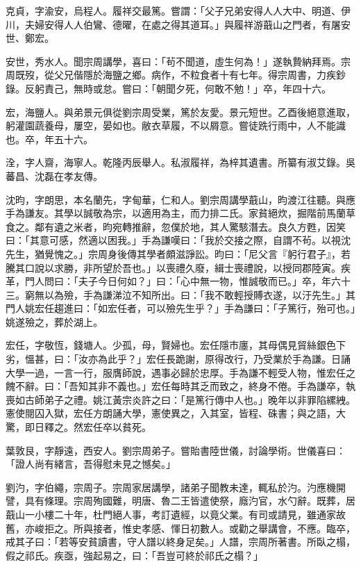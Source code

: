 \begin{pinyinscope}
克貞，字渝安，烏程人。履祥交最篤。嘗謂：「父子兄弟安得人人大中、明道、伊川，夫婦安得人人伯鸞、德曜，在處之得其道耳。」與履祥游蕺山之門者，有屠安世、鄭宏。

安世，秀水人。聞宗周講學，喜曰：「茍不聞道，虛生何為！」遂執贄納拜焉。宗周既歿，從父兄偕隱於海鹽之鄉。病作，不粒食者十有七年。得宗周書，力疾鈔錄。反躬責己，無時或怠。嘗曰：「朝聞夕死，何敢不勉！」卒，年四十六。

宏，海鹽人。與弟景元俱從劉宗周受業，篤於友愛。景元短世。乙酉後絕意進取，躬灌園蔬養母，屢空，晏如也。敝衣草履，不以屑意。嘗徒跣行雨中，人不能識也。卒，年五十六。

洤，字人齋，海寧人。乾隆丙辰舉人。私淑履祥，為梓其遺書。所纂有淑艾錄。吳蕃昌、沈磊在孝友傳。

沈昀，字朗思，本名蘭先，字甸華，仁和人。劉宗周講學蕺山，昀渡江往聽。與應手為謙友。其學以誠敬為宗，以適用為主，而力排二氏。家貧絕炊，掘階前馬蘭草食之。鄰有遺之米者，昀宛轉推辭，忽僕於地，其人驚駭潛去。良久方甦，因笑曰：「其意可感，然適以困我。」手為謙嘆曰：「我於交接之際，自謂不茍。以視沈先生，猶覺愧之。」宗周身後傳其學者頗滋諍訟。昀曰：「尼父言『躬行君子』，若騰其口說以求勝，非所望於吾也。」以喪禮久廢，緝士喪禮說，以授同郡陸寅。疾革，門人問曰：「夫子今日何如？」曰：「心中無一物，惟誠敬而已。」卒，年六十三。窮無以為殮，手為謙涕泣不知所出。曰：「我不敢輕授賻衣遂，以汙先生。」其門人姚宏任趨進曰：「如宏任者，可以殮先生乎？」手為謙曰：「子篤行，殆可也。」姚遂殮之，葬於湖上。

宏任，字敬恆，錢塘人。少孤，母，賢婦也。宏任隱巿廛，其母偶見貿絲銀色下劣，慍甚，曰：「汝亦為此乎？」宏任長跪謝，原得改行，乃受業於手為謙。日誦大學一過，一言一行，服膺師說，遇事必歸於忠厚。手為謙不輕受人物，惟宏任之餽不辭。曰：「吾知其非不義也。」宏任每時其乏而致之，終身不倦。手為謙卒，執喪如古師弟子之禮。姚江黃宗炎許之曰：「是篤行傳中人也。」晚年以非罪陷縲絏。憲使閱囚入獄，宏任方朗誦大學，憲使異之，入其室，皆程、硃書；與之語，大驚，即日釋之。然宏任卒以貧死。

葉敦艮，字靜遠，西安人。劉宗周弟子。嘗貽書陸世儀，討論學術。世儀喜曰：「證人尚有緒言，吾得慰未見之憾矣。」

劉汋，字伯繩，宗周子。宗周家居講學，諸弟子聞教未達，輒私於汋。汋應機開譬，具有條理。宗周殉國難，明唐、魯二王皆遣使祭，廕汋官，水勺辭。既葬，居蕺山一小樓二十年，杜門絕人事，考訂遺經，以竟父業。有司或請見，雖通家故舊，亦峻拒之。所與接者，惟史孝感、惲日初數人。或勸之舉講會，不應。臨卒，戒其子曰：「若等安貧讀書，守人譜以終身足矣。」人譜，宗周所著書。所臥之榻，假之祁氏。疾亟，強起易之，曰：「吾豈可終於祁氏之榻？」


\end{pinyinscope}
